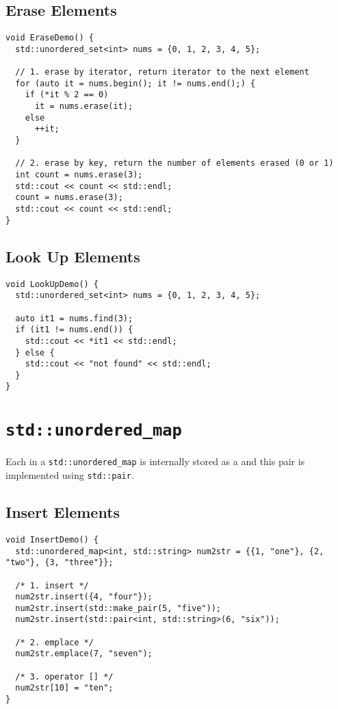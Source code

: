 \subsection{Erase Elements}
\begin{lstlisting}
void EraseDemo() {
  std::unordered_set<int> nums = {0, 1, 2, 3, 4, 5};

  // 1. erase by iterator, return iterator to the next element
  for (auto it = nums.begin(); it != nums.end();) {
    if (*it % 2 == 0)
      it = nums.erase(it);
    else
      ++it;
  }

  // 2. erase by key, return the number of elements erased (0 or 1)
  int count = nums.erase(3);
  std::cout << count << std::endl;
  count = nums.erase(3);
  std::cout << count << std::endl;
}
\end{lstlisting}

\subsection{Look Up Elements}
\begin{lstlisting}
void LookUpDemo() {
  std::unordered_set<int> nums = {0, 1, 2, 3, 4, 5};

  auto it1 = nums.find(3);
  if (it1 != nums.end()) {
    std::cout << *it1 << std::endl;
  } else {
    std::cout << "not found" << std::endl;
  }
}
\end{lstlisting}

\section{{\colorbox{CodeBackground}{\lstinline|std::unordered_map|}}}
Each {\color{blue}{element}} in a {\colorbox{CodeBackground}{\lstinline|std::unordered_map|}} is internally stored as a {\color{blue}{key-value pair,}} and this pair is implemented using {\colorbox{CodeBackground}{\lstinline|std::pair|}}.

\subsection{Insert Elements}
\begin{lstlisting}
void InsertDemo() {
  std::unordered_map<int, std::string> num2str = {{1, "one"}, {2, "two"}, {3, "three"}};

  /* 1. insert */
  num2str.insert({4, "four"});
  num2str.insert(std::make_pair(5, "five"));
  num2str.insert(std::pair<int, std::string>(6, "six"));

  /* 2. emplace */
  num2str.emplace(7, "seven");

  /* 3. operator [] */
  num2str[10] = "ten";
}
\end{lstlisting}

